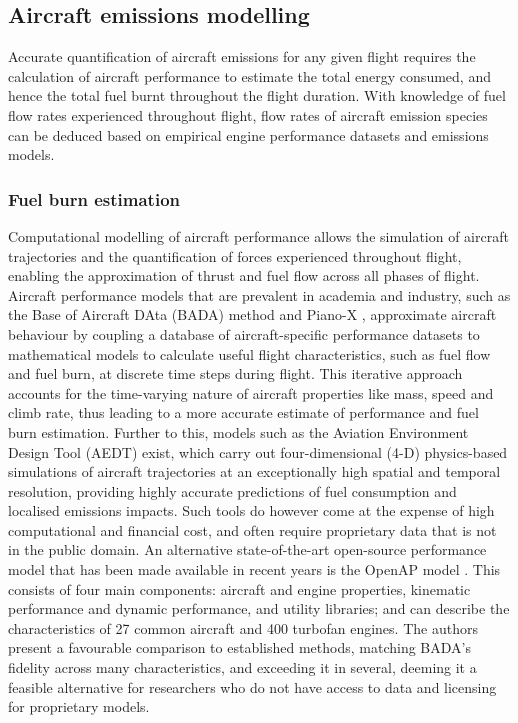 

\subsection{Aircraft emissions modelling}
Accurate quantification of aircraft emissions for any given flight requires the calculation of aircraft performance to estimate the total energy consumed, and hence the total fuel burnt throughout the flight duration. With knowledge of fuel flow rates experienced throughout flight, flow rates of aircraft emission species can be deduced based on empirical engine performance datasets and emissions models.

\subsubsection{Fuel burn estimation}
Computational modelling of aircraft performance allows the simulation of aircraft trajectories and the quantification of forces experienced throughout flight, enabling the approximation of thrust and fuel flow across all phases of flight. Aircraft performance models that are prevalent in academia and industry, such as the Base of Aircraft DAta (BADA) method \cite{Nuic2010} and Piano-X \cite{PIANO_X}, approximate aircraft behaviour by coupling a database of aircraft-specific performance datasets to mathematical models to calculate useful flight characteristics, such as fuel flow and fuel burn, at discrete time steps during flight. This iterative approach accounts for the time-varying nature of aircraft properties like mass, speed and climb rate, thus leading to a more accurate estimate of performance and fuel burn estimation. Further to this, models such as the Aviation Environment Design Tool (AEDT) \cite{AEDT} exist, which carry out four-dimensional (4-D) physics-based simulations of aircraft trajectories at an exceptionally high spatial and temporal resolution, providing highly accurate predictions of fuel consumption and localised emissions impacts. Such tools do however come at the expense of high computational and financial cost, and often require proprietary data that is not in the public domain. An alternative state-of-the-art open-source performance model that has been made available in recent years is the OpenAP model \cite{Sun2020}. This consists of four main components: aircraft and engine properties, kinematic performance and dynamic performance, and utility libraries; and can describe the characteristics of 27 common aircraft and 400 turbofan engines. The authors present a favourable comparison to established methods, matching BADA's fidelity across many characteristics, and exceeding it in several, deeming it a feasible alternative for researchers who do not have access to data and licensing for proprietary models. 


